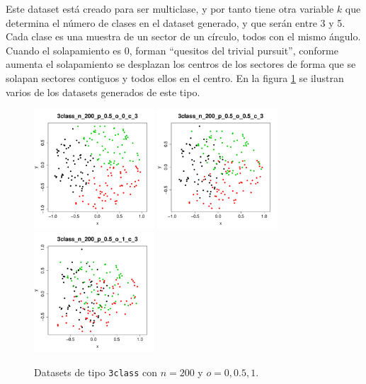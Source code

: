 \documentclass[a4paper,12pt]{report}
\theoremstyle{definition}
\begin{document}
\begin{itemize}
  Este dataset está creado para ser multiclase, y por tanto tiene otra variable $k$ que determina el número de clases en el dataset generado, y que serán entre 3 y 5. Cada clase es una muestra de un sector de un círculo, todos con el mismo ángulo. Cuando el solapamiento es 0, forman ``quesitos del trivial pursuit'', conforme aumenta el solapamiento se desplazan los centros de los sectores de forma que se solapan sectores contiguos y todos ellos en el centro. En la figura \ref{fig:3class} se ilustran varios de los datasets generados de este tipo.

  \begin{figure}[H]
    \centering
    \includegraphics[width=0.4\textwidth]{plots/3class_o_0}
    \includegraphics[width=0.4\textwidth]{plots/3class_o_1}
    \includegraphics[width=0.4\textwidth]{plots/3class_o_2}
    \caption{Datasets de tipo \texttt{3class} con $n = 200$ y $o = 0, 0.5, 1$.}
    \label{fig:3class}
  \end{figure}


\end{itemize}
\end{document}
